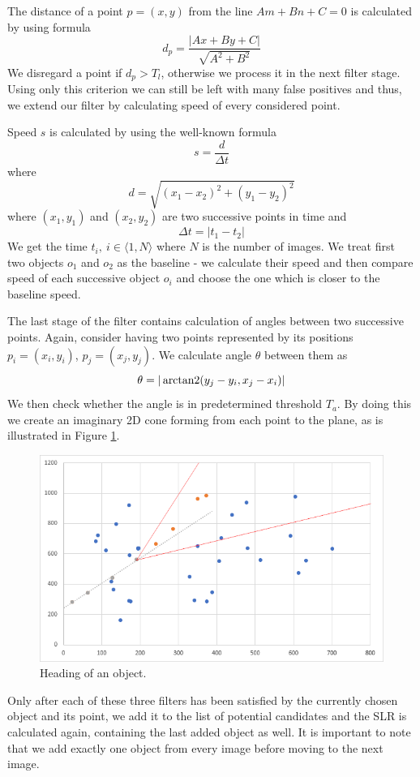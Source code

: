 	The distance of a point $p=(x,y)$ from the line $Am+Bn+C=0$ is calculated by using formula $$d_p=\frac{|Ax+By+C|}{\sqrt{A^2+B^2}}$$ We disregard a point if $d_p>T_l$, otherwise we process it in the next filter stage. Using only this criterion we can still be left with many false positives and thus, we extend our filter by calculating speed of every considered point. 
	
	Speed $s$ is calculated by using the well-known formula $$s=\frac{d}{{\Delta}t}$$ where $$d=\sqrt{(x_1-x_2)^2 + (y_1-y_2)^2}$$ where $(x_1,y_1)$ and $(x_2,y_2)$ are two successive points in time and $${\Delta}t=|t_1-t_2|$$ We get the time $t_{i},\ i\in\langle1,N\rangle$ where $N$ is the number of images. We treat first two objects $o_1$ and $o_2$ as the baseline - we calculate their speed and then compare speed of each successive object $o_i$ and choose the one which is closer to the baseline speed.
	
	The last stage of the filter contains calculation of angles between two successive points. Again, consider having two points represented by its positions $p_{i}=(x_i,y_i)$, $p_j=(x_j,y_j)$. We calculate angle $\theta$ between them as $$\theta=|\operatorname{arctan2}(y_j-y_i, x_j-x_i)|$$ We then check whether the angle is in predetermined threshold $T_a$. By doing this we create an imaginary 2D cone forming from each point to the plane, as is illustrated in Figure \ref{fig:regresia2}.
	
	\begin{figure}[H]
	\centering
	  \includegraphics[width=12cm]{images/regresia2}
		  \caption{Heading of an object.}
	  \label{fig:regresia2}
	\end{figure}
	
	Only after each of these three filters has been satisfied by the currently chosen object and its point, we add it to the list of potential candidates and the SLR is calculated again, containing the last added object as well. It is important to note that we add exactly one object from every image before moving to the next image.
	
